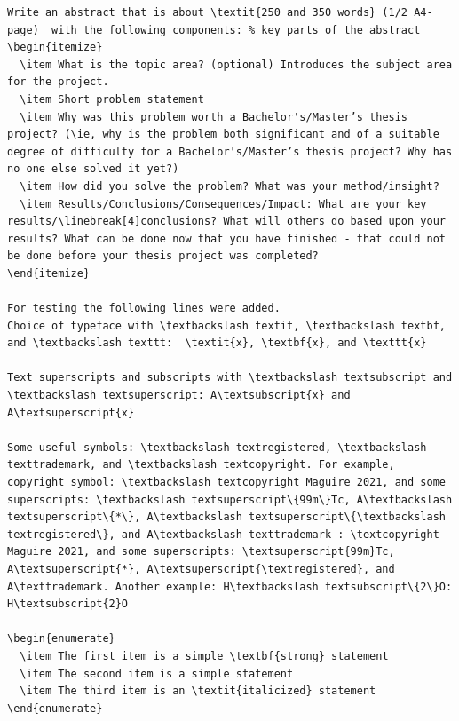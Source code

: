 	
\begin{lstlisting}[language={}, caption={Source \LaTeX~(from inside the scontents of the abstract)}, label=lst:JSONtoLadokK]
Write an abstract that is about \textit{250 and 350 words} (1/2 A4-page)  with the following components: % key parts of the abstract
\begin{itemize}
  \item What is the topic area? (optional) Introduces the subject area for the project.
  \item Short problem statement
  \item Why was this problem worth a Bachelor's/Master’s thesis project? (\ie, why is the problem both significant and of a suitable degree of difficulty for a Bachelor's/Master’s thesis project? Why has no one else solved it yet?)
  \item How did you solve the problem? What was your method/insight?
  \item Results/Conclusions/Consequences/Impact: What are your key results/\linebreak[4]conclusions? What will others do based upon your results? What can be done now that you have finished - that could not be done before your thesis project was completed?
\end{itemize}

For testing the following lines were added.
Choice of typeface with \textbackslash textit, \textbackslash textbf, and \textbackslash texttt:  \textit{x}, \textbf{x}, and \texttt{x}

Text superscripts and subscripts with \textbackslash textsubscript and \textbackslash textsuperscript: A\textsubscript{x} and A\textsuperscript{x}

Some useful symbols: \textbackslash textregistered, \textbackslash texttrademark, and \textbackslash textcopyright. For example, copyright symbol: \textbackslash textcopyright Maguire 2021, and some superscripts: \textbackslash textsuperscript\{99m\}Tc, A\textbackslash textsuperscript\{*\}, A\textbackslash textsuperscript\{\textbackslash textregistered\}, and A\textbackslash texttrademark : \textcopyright Maguire 2021, and some superscripts: \textsuperscript{99m}Tc, A\textsuperscript{*}, A\textsuperscript{\textregistered}, and A\texttrademark. Another example: H\textbackslash textsubscript\{2\}O: H\textsubscript{2}O

\begin{enumerate}
  \item The first item is a simple \textbf{strong} statement
  \item The second item is a simple statement
  \item The third item is an \textit{italicized} statement
\end{enumerate}


\end{lstlisting}
